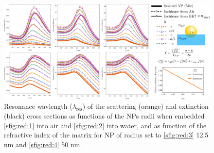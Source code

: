 \begin{figure}\centering
\includegraphics[width = .9\textwidth ]{2-Results-Figs/QnormIntExt-inc.png}%
\caption[Convergence tests: The Meshing]{Resonance wavlength ($\lambda_\text{res}$) of the scattering (orange) and extinction (black) cross sections as functions of the NPs radii when embedded  \ref{sfig:red:1} into air and \ref{sfig:red:2} into water, and as function of the refractive index of the matrix for NP of radius set to  \ref{sfig:red:3} 12.5 nm and \ref{sfig:red:4} 50 nm.}
\end{figure}
